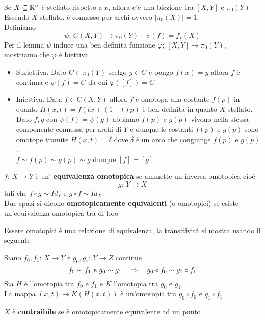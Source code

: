  \begin{cor}Se $X \subseteq \mathbb{R}^n$ \`e stellato rispetto a $p$, allora c'\`e una biezione tra $[X,Y]$ e $\pi_0(Y)$ 
 \proof Essendo $X$ stellato, \`e connesso per archi ovvero $ \vert \pi_0(X)\vert=1$.\\
 Definiamo 
 $$ \psi:\, C (X,Y) \to \pi_0(Y) \quad \psi(f)= f_\star(X)$$
 Per il lemma $\psi$ induce una ben definita funzione $\varphi;\, [X,Y ]\to \pi_0(Y)$, mostriamo che $\varphi$ \`e biettiva
 \begin{itemize}
 \item Suriettiva. Dato $C\in \pi_0(Y)$ scelgo $y \in C$ e pongo $f(x)=y$ allora $f$ \`e continua e $\psi(f)=C$ da cui $\varphi([f])=C$ 
 \item Iniettiva. Data $f\in C (X,Y)$ allora $f$ \`e omotopa alla costante $f(p)$ in quanto $H(x,t)= f( tx+(1-t)p)$  \`e ben definita in quanto $X$ stellato.\\
 Dato $f,g$ con $\psi(f)=\psi(g)$ abbiamo $f(p)$ e $g(p)$ vivono nella stessa componente connessa per archi di $Y$ e dunque le costanti $f(p)$ e $g(p)$ sono omotope tramite $H(x,t)=\delta$ dove $\delta$ \`e un arco che congiunge $f(p)$ e $g(p)$.\\
 $ f \sim f(p) \sim g(p) \sim g$ dunque $[f]=[g]$\endproof
 \end{itemize}
 \end{cor}
 \spazio
 \begin{defn}$f:\, X \to Y$ \`e un' \textbf{ equivalenza omotopica } se ammette un inversa omotopica cio\`e 
 $$ g:\, Y \to X $$ 
 tali che $f \circ g \sim Id_Y$ e $ g \circ f \sim Id_X$.\\
 Due spazi si dicono \textbf{ omotopicamente equivalenti} (o omotopici) se esiste un'equivalenza omotopica tra di loro
 \end{defn}
 \begin{prop}Essere omotopici \`e una relazione di equivalenza, la transitivit\`a si mostra usando il seguente 
 \begin{lem}Siano $f_0,f_1:\, X \to Y$ e $g_0,g_1:\, Y \to Z $ continue $$ f_0 \sim f_1 \text{ e } g_0 \sim g_1 \quad \Rightarrow \quad g_0 \circ f_0 \sim g_1 \circ f_1$$
 \proof Sia $H$ \`e l'omotopia tra $f_0$ e $f_1$ e $K$ l'omotopia tra $g_0$ e $g_1$.\\
 La mappa $ (x,t) \to K(H(x,t))$ \`e un'omotopia tra $g_0 \circ f_0 $ e $g_1 \circ f_1$
 \end{lem}
 \end{prop}
 \spazio
 \begin{defn}$X$ \`e  \textbf{ contraibile } se \`e omotopicamente equivalente ad un punto
 \end{defn}
